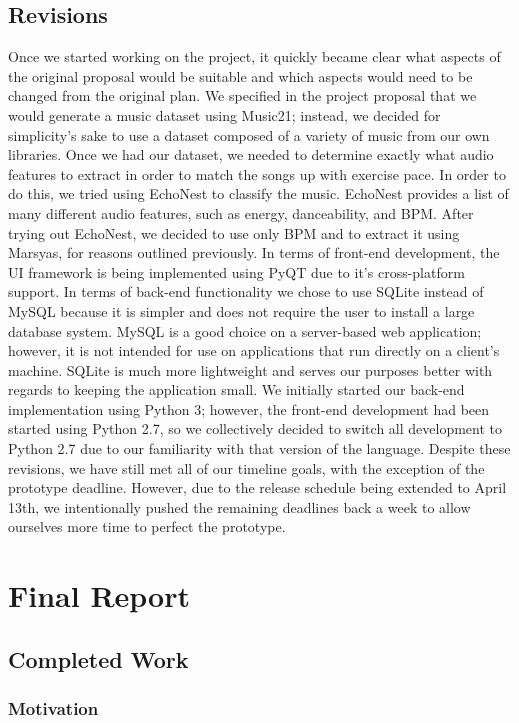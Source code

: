 \documentclass{article}
\begin{document}
\subsection{Revisions}
Once we started working on the project, it quickly became clear what aspects of the original proposal would be suitable and which aspects would need to be changed from the original plan. We specified in the project proposal that we would generate a music dataset using Music21; instead, we decided for simplicity's sake to use a dataset composed of a variety of music from our own libraries. Once we had our dataset, we needed to determine exactly what audio features to extract in order to match the songs up with exercise pace. In order to do this, we tried using EchoNest to classify the music. EchoNest provides a list of many different audio features, such as energy, danceability, and BPM. After trying out EchoNest, we decided to use only BPM and to extract it using Marsyas, for reasons outlined previously. In terms of front-end development, the UI framework is being implemented using PyQT due to it's cross-platform support. In terms of back-end functionality we chose to use SQLite \cite{SQLite} instead of MySQL because it is simpler and does not require the user to install a large database system. MySQL is a good choice on a server-based web application; however, it is not intended for use on applications that run directly on a client's machine. SQLite is much more lightweight and serves our purposes better with regards to keeping the application small. We initially started our back-end implementation using Python 3; however, the front-end development had been started using Python 2.7, so we collectively decided to switch all development to Python 2.7 due to our familiarity with that version of the language. Despite these revisions, we have still met all of our timeline goals, with the exception of the prototype deadline. However, due to the release schedule being extended to April 13th, we intentionally pushed the remaining deadlines back a week to allow ourselves more time to perfect the prototype.

\section{Final Report}
\subsection{Completed Work}
\subsubsection{Motivation}
\end{document}
